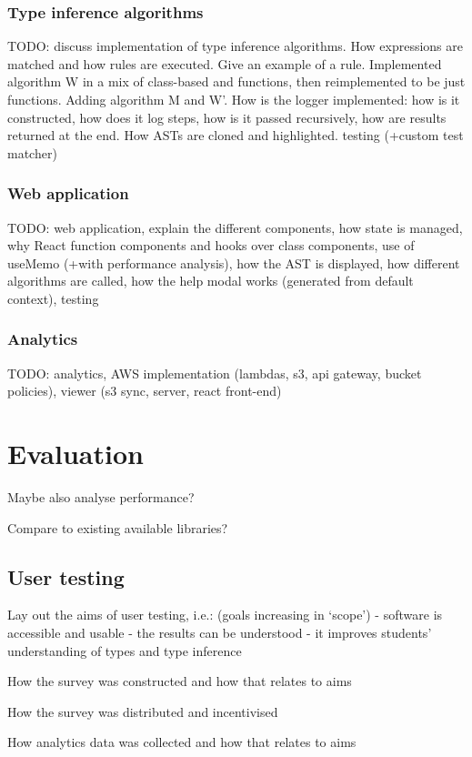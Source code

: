 \documentclass[a4paper,fleqn,12pt]{article}
\begin{document}
\subsubsection{Type inference algorithms}\label{id:h.flyu66glh76t}
TODO: discuss implementation of type inference algorithms. How expressions are matched and how rules are executed. Give an example of a rule. Implemented algorithm W in a mix of class-based and functions, then reimplemented to be just functions. Adding algorithm M and W’. How is the logger implemented: how is it constructed, how does it log steps, how is it passed recursively, how are results returned at the end. How ASTs are cloned and highlighted. testing (+custom test matcher)
\subsubsection{Web application}\label{id:h.jqmg1n3w35mp}
TODO: web application, explain the different components, how state is managed, why React function components and hooks over class components, use of useMemo (+with performance analysis), how the AST is displayed, how different algorithms are called, how the help modal works (generated from default context), testing
\subsubsection{Analytics}\label{id:h.39bhrrv1fi5p}
TODO: analytics, AWS implementation (lambdas, s3, api gateway, bucket policies), viewer (s3 sync, server, react front-end)
\section{Evaluation}\label{id:h.e6letww4nhn0}
Maybe also analyse performance?

Compare to existing available libraries?

\subsection{User testing}\label{id:h.bsy9mpun8nk3}
Lay out the aims of user testing, i.e.: (goals increasing in ‘scope’)
- software is accessible and usable
- the results can be understood
- it improves students’ understanding of types and type inference

How the survey was constructed and how that relates to aims

How the survey was distributed and incentivised

How analytics data was collected and how that relates to aims
\end{document}
